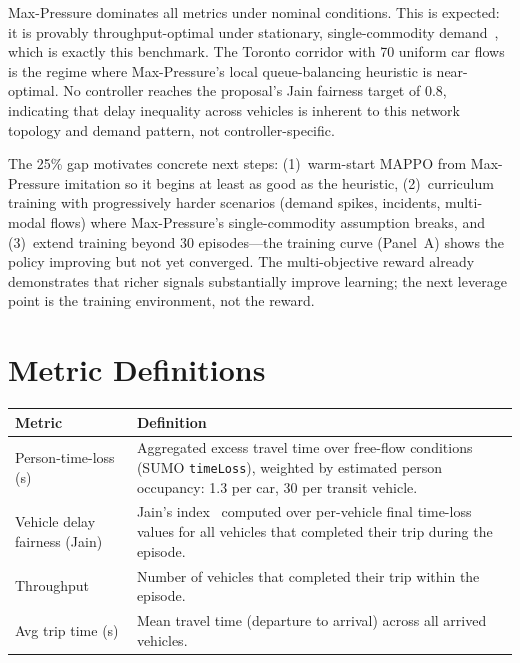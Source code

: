 Max-Pressure dominates all metrics under nominal conditions. This is expected:
it is provably throughput-optimal under stationary, single-commodity
demand~\cite{max_pressure_optimal}, which is exactly this benchmark. The
Toronto corridor with 70 uniform car flows is the regime where Max-Pressure's
local queue-balancing heuristic is near-optimal. No controller reaches the
proposal's Jain fairness target of 0.8, indicating that delay inequality
across vehicles is inherent to this network topology and demand pattern, not
controller-specific.

The 25\% gap motivates concrete next steps: (1)~warm-start MAPPO from
Max-Pressure imitation so it begins at least as good as the heuristic,
(2)~curriculum training with progressively harder scenarios (demand spikes,
incidents, multi-modal flows) where Max-Pressure's single-commodity assumption
breaks, and (3)~extend training beyond 30 episodes---the training curve
(Panel~A) shows the policy improving but not yet converged. The
multi-objective reward already demonstrates that richer signals substantially
improve learning; the next leverage point is the training environment, not the
reward.




\appendix

\section{Metric Definitions}
\label{app:metrics}

\begin{tabularx}{\columnwidth}{@{}l X@{}}
\toprule
\textbf{Metric} & \textbf{Definition} \\
\midrule
Person-time-loss (s) & Aggregated excess travel time over free-flow conditions (SUMO \texttt{timeLoss}), weighted by estimated person occupancy: 1.3 per car, 30 per transit vehicle. \\
Vehicle delay fairness (Jain) & Jain's index~\cite{jain1984} computed over per-vehicle final time-loss values for all vehicles that completed their trip during the episode. \\
Throughput & Number of vehicles that completed their trip within the episode. \\
Avg trip time (s) & Mean travel time (departure to arrival) across all arrived vehicles. \\
\bottomrule
\end{tabularx}

